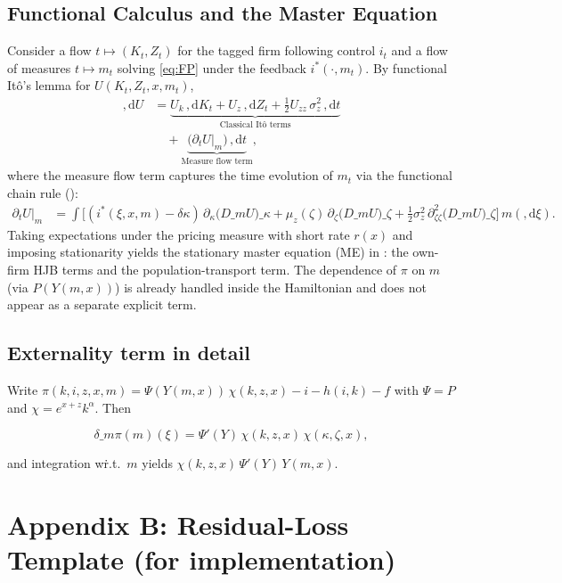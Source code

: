 ﻿\documentclass[11pt,letterpaper,oneside]{article}
\numberwithin{equation}{section}
\newcommand{\1}{\mathbf{1}}
\newcommand{\diff}{,\mathrm{d}}
\newcommand{\Dm}{D\_m}
\begin{document}
\subsection*{Functional Calculus and the Master Equation}\label{app:master-derivation}
Consider a flow $t\mapsto (K_t,Z_t)$ for the tagged firm following control $i_t$ and a flow of measures $t\mapsto m_t$ solving \eqref{eq:FP} under the feedback $i^*(\cdot,m_t)$. By functional Itô's lemma for $U(K_t,Z_t,x,m_t)$,
\begin{align*}
\diff U &= \underbrace{U_k\,\diff K_t + U_z\,\diff Z_t + \tfrac12 U_{zz}\,\sigma_z^2\,\diff t}_{\text{Classical Itô terms}} \\
        &\quad + \underbrace{\big(\partial_t U\big|_{m}\big)\,\diff t}_{\text{Measure flow term}},
\end{align*}
where the measure flow term captures the time evolution of $m_t$ via the functional chain rule ():
\begin{align*}
\partial_t U\big|_{m} &= \int \Big[ (i^*(\xi,x,m)-\delta\kappa)\,\partial_{\kappa}\big(\Dm U\big)\!\_\kappa
  +\mu_z(\zeta)\,\partial_{\zeta}\big(\Dm U\big)\!\_\zeta
  +\tfrac12\sigma_z^2\,\partial_{\zeta\zeta}^2\big(\Dm U\big)\!\_\zeta\Big] \, m(\diff \xi).
\end{align*}
Taking expectations under the pricing measure with short rate $r(x)$ and imposing stationarity yields the stationary master equation (ME) in : the own-firm HJB terms and the population-transport term. The dependence of $\pi$ on $m$ (via $P(Y(m,x))$) is already handled inside the Hamiltonian and does not appear as a separate explicit term.

\subsection*{Externality term in detail}
Write $\pi(k,i,z,x,m)=\Psi(Y(m,x))\,\chi(k,z,x)-i-h(i,k)-f$ with $\Psi=P$ and $\chi=e^{x+z}k^\alpha$. Then

$$
\delta\_m\pi(m)(\xi)=\Psi'(Y)\,\chi(k,z,x)\,\chi(\kappa,\zeta,x),
$$

and integration w\.r.t.\ $m$ yields $\chi(k,z,x)\,\Psi'(Y)\,Y(m,x)$.

\section{Appendix B: Residual-Loss Template (for implementation)}\label{app:loss}
\end{document}
